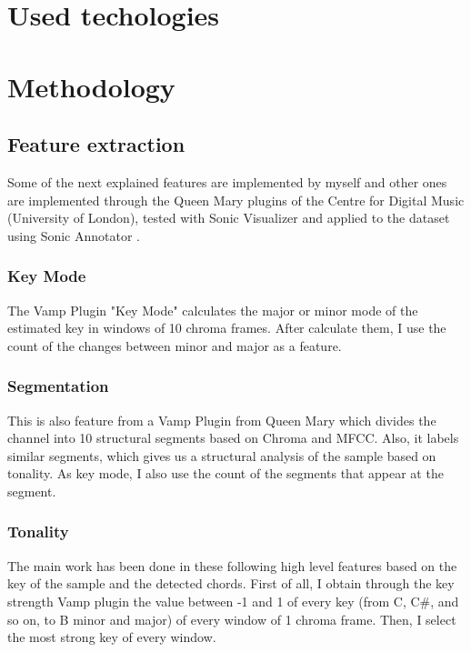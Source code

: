 \documentclass[a4paper,openany,oneside,12pt]{book}
\begin{document}
\chapter{Used techologies}\label{used_techs}



\chapter{Methodology}\label{methodology}

\section{Feature extraction}\label{sec:feature_extraction}

Some of the next explained features are implemented by myself and other ones are implemented through the Queen Mary plugins of the Centre for Digital Music (University of London), tested with Sonic Visualizer \cite{SonicVisualiser} and applied to the dataset using Sonic Annotator \cite{chris2010a}.

\subsection{Key Mode}\label{subsec:keymode}

The Vamp Plugin "Key Mode" calculates the major or minor mode of the estimated key in windows of 10 chroma frames. After calculate them, I use the count of the changes between minor and major as a feature.

\subsection{Segmentation}\label{subsec:segmentation}

This is also feature from a Vamp Plugin from Queen Mary which divides the channel into 10 structural segments based on Chroma and MFCC. Also, it labels similar segments, which gives us a structural analysis of the sample based on tonality. As key mode, I also use the count of the segments that appear at the segment.

\subsection{Tonality}\label{subsec:chord_windows}

The main work has been done in these following high level features based on the key of the sample and the detected chords. First of all, I obtain through the key strength Vamp plugin the value between -1 and 1 of every key (from C, C\#, and so on, to B minor and major) of every window of 1 chroma frame. Then, I select the most strong key of every window.
\end{document}
